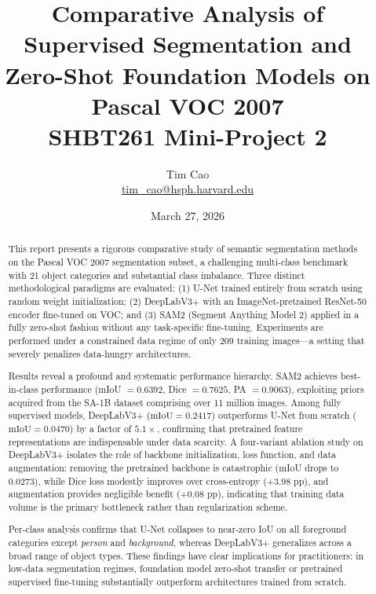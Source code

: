 \documentclass[11pt,a4paper]{article}
\title{\textbf{Comparative Analysis of Supervised Segmentation and\\
Zero-Shot Foundation Models on Pascal VOC 2007}\\[0.5em]
\large SHBT261 Mini-Project 2}
\author{Tim Cao\\
\small \href{mailto:tim_cao@hsph.harvard.edu}{tim\_cao@hsph.harvard.edu}}
\date{March 27, 2026}
\begin{document}
\maketitle
\tableofcontents
\newpage

\begin{abstract}
\noindent
This report presents a rigorous comparative study of semantic segmentation methods on the Pascal VOC 2007 segmentation subset, a challenging multi-class benchmark with 21 object categories and substantial class imbalance. Three distinct methodological paradigms are evaluated: (1) U-Net trained entirely from scratch using random weight initialization; (2) DeepLabV3+ with an ImageNet-pretrained ResNet-50 encoder fine-tuned on VOC; and (3) SAM2 (Segment Anything Model 2) applied in a fully zero-shot fashion without any task-specific fine-tuning. Experiments are performed under a constrained data regime of only 209 training images---a setting that severely penalizes data-hungry architectures.

Results reveal a profound and systematic performance hierarchy. SAM2 achieves best-in-class performance (mIoU $= 0.6392$, Dice $= 0.7625$, PA $= 0.9063$), exploiting priors acquired from the SA-1B dataset comprising over 11 million images. Among fully supervised models, DeepLabV3+ ($\text{mIoU} = 0.2417$) outperforms U-Net from scratch ($\text{mIoU} = 0.0470$) by a factor of $5.1\times$, confirming that pretrained feature representations are indispensable under data scarcity. A four-variant ablation study on DeepLabV3+ isolates the role of backbone initialization, loss function, and data augmentation: removing the pretrained backbone is catastrophic (mIoU drops to $0.0273$), while Dice loss modestly improves over cross-entropy (+3.98 pp), and augmentation provides negligible benefit (+0.08 pp), indicating that training data volume is the primary bottleneck rather than regularization scheme.

Per-class analysis confirms that U-Net collapses to near-zero IoU on all foreground categories except \textit{person} and \textit{background}, whereas DeepLabV3+ generalizes across a broad range of object types. These findings have clear implications for practitioners: in low-data segmentation regimes, foundation model zero-shot transfer or pretrained supervised fine-tuning substantially outperform architectures trained from scratch.
\end{abstract}

\newpage
\end{document}

